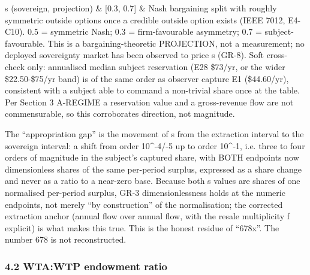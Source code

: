 \documentclass[
  11pt,
]{article}
\begin{document}
{\begin{longtable}[]
s (sovereign, projection) & {[}0.3, 0.7{]} & Nash bargaining split with
roughly symmetric outside options once a credible outside option exists
(IEEE 7012, E4-C10). 0.5 = symmetric Nash; 0.3 = firm-favourable
asymmetry; 0.7 = subject-favourable. This is a bargaining-theoretic
PROJECTION, not a measurement; no deployed sovereignty market has been
observed to price s (GR-8). Soft cross-check only: annualised median
subject reservation (E28 \$73/yr, or the wider \$22.50-\$75/yr band) is
of the same order as observer capture E1 (\$44.60/yr), consistent with a
subject able to command a non-trivial share once at the table. Per
Section 3 A-REGIME a reservation value and a gross-revenue flow are not
commensurable, so this corroborates direction, not magnitude. \\
\end{longtable}
}

The ``appropriation gap'' is the movement of s from the extraction
interval to the sovereign interval: a shift from order 10\^{}-4/-5 up to
order 10\^{}-1, i.e. three to four orders of magnitude in the subject's
captured share, with BOTH endpoints now dimensionless shares of the same
per-period surplus, expressed as a share change and never as a ratio to
a near-zero base. Because both s values are shares of one normalised
per-period surplus, GR-3 dimensionlessness holds at the numeric
endpoints, not merely ``by construction'' of the normalisation; the
corrected extraction anchor (annual flow over annual flow, with the
resale multiplicity f explicit) is what makes this true. This is the
honest residue of ``678x''. The number 678 is not reconstructed.

\subsubsection{4.2 WTA:WTP endowment
ratio}\label{wtawtp-endowment-ratio}
\end{document}
